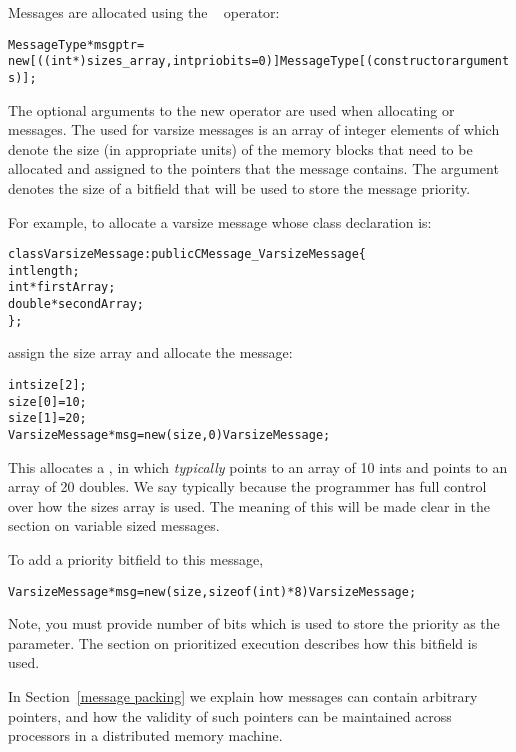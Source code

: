 Messages are allocated using the \CC\  operator:

\begin{alltt}
 MessageType *msgptr =
  new [((int *)sizes_array, int priobits=0)] MessageType[(constructor arguments)];
\end{alltt}

The optional arguments to the new operator are used when allocating
 or  messages. The  used for
varsize messages is an array of integer elements of which denote the size (in
appropriate units) of the memory blocks that need to be allocated and assigned
to the pointers that the message contains. The  argument denotes
the size of a bitfield that will be used to store the message priority.   

For example, to allocate a varsize message whose 
class declaration is:

\begin{alltt}
class VarsizeMessage : public CMessage_VarsizeMessage \{
  int length;
  int *firstArray;
  double *secondArray;
\};
\end{alltt}

assign the size array and allocate the message:

\begin{alltt}
int size[2];
size[0] = 10;
size[1] = 20;
VarsizeMessage *msg = new (size,0) VarsizeMessage;
\end{alltt}

This allocates a , in which {\em typically} 
points to an array of 10 ints and  points to an array of 20
doubles. We say typically because the programmer has full control over how the
sizes array is used. The meaning of this will be made clear in the section on
variable sized messages.

To add a priority bitfield to this message, 

\begin{alltt}
VarsizeMessage *msg = new (size, sizeof(int)*8) VarsizeMessage;
\end{alltt}

Note, you must provide number of bits which is used to store the priority as
the  parameter. The section on prioritized execution describes how
this bitfield is used.

In Section~\ref{message packing} we explain how messages can contain arbitrary
pointers, and how the validity of such pointers can be maintained across
processors in a distributed memory machine.

